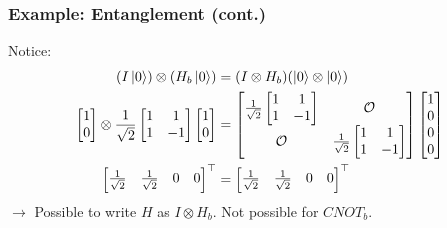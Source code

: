 \documentclass{beamer}
\theoremstyle{definition}
\begin{document}
\begin{frame}
\frametitle{Example: Entanglement (cont.)}
Notice:
\begin{align*}
(I\left\vert{0}\right\rangle) \otimes (H_b\left\vert{0}\right\rangle) &= (I \otimes H_b)(\left\vert{0}\right\rangle \otimes \left\vert{0}\right\rangle) \\
\begin{bmatrix}
1\\0
\end{bmatrix}
\otimes
\frac{1}{\sqrt{2}}
\begin{bmatrix}
1&1\\1&-1
\end{bmatrix}
\begin{bmatrix}
1\\0
\end{bmatrix}
&=
\begin{bmatrix}
\frac{1}{\sqrt{2}}\begin{bmatrix}
1&1\\
1&-1
\end{bmatrix}& \mathcal{O}\\
\mathcal{O} & \frac{1}{\sqrt{2}}\begin{bmatrix}
1&1\\1&-1
\end{bmatrix}
\end{bmatrix}\begin{bmatrix}
1\\0\\0\\0
\end{bmatrix}\\
\begin{bmatrix}
\frac{1}{\sqrt{2}} & \frac{1}{\sqrt{2}} & 0&0
\end{bmatrix}^\top &= \begin{bmatrix}\frac{1}{\sqrt{2}} & \frac{1}{\sqrt{2}} & 0&0
\end{bmatrix}^\top 
\end{align*}
$\rightarrow$ Possible to write $H$ as $I \otimes H_b$. Not possible for $CNOT_b$.
\end{frame}
\end{document}
